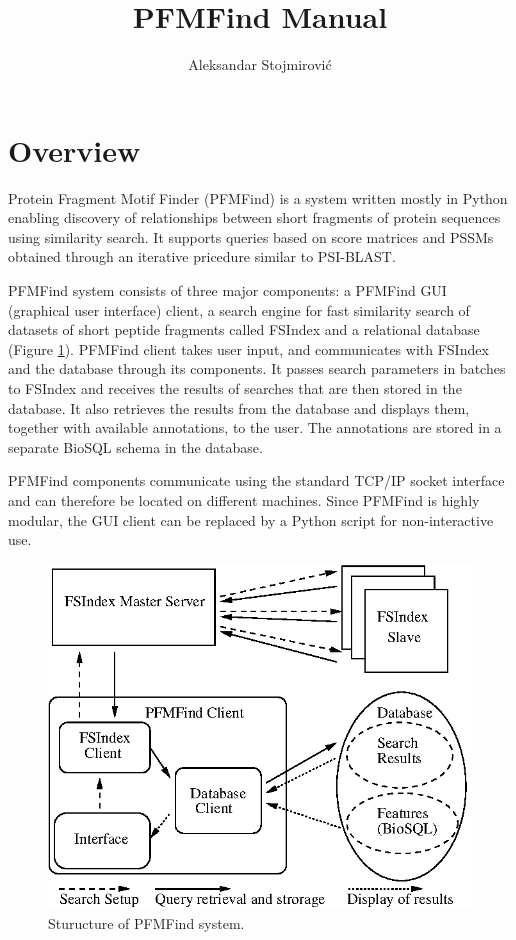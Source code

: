 \documentclass[11pt]{article}
\title{PFMFind Manual}
\author{Aleksandar Stojmirovi\'c}
\begin{document}
\maketitle
\tableofcontents

\newpage

\section{Overview}
Protein Fragment Motif Finder (PFMFind) is a system written mostly in Python enabling discovery of relationships between short fragments of protein sequences using similarity search. It supports queries based on score matrices and PSSMs obtained through an iterative pricedure similar to PSI-BLAST.

PFMFind system consists of three major components: a PFMFind GUI (graphical user interface) client, a search engine for fast similarity search of datasets of short peptide fragments called FSIndex and a relational database (Figure \ref{fig:PFMFind_struct}). PFMFind client takes user input, and communicates with FSIndex and the database through its components. It passes search parameters in batches to FSIndex and receives the results of searches that are then stored in the database. It also retrieves the results from the database and displays them, together with available annotations, to the user. The annotations are stored in a separate BioSQL schema in the database.

PFMFind components communicate using the standard TCP/IP socket interface and can therefore be located on different machines. Since PFMFind is highly modular, the GUI client can be replaced by a Python script for non-interactive use.

\begin{figure}[!tpb]
\centerline{\includegraphics{PFMFind_struct.eps}}
\caption{Sturucture of PFMFind system.}\label{fig:PFMFind_struct}
\end{figure}
\end{document}
